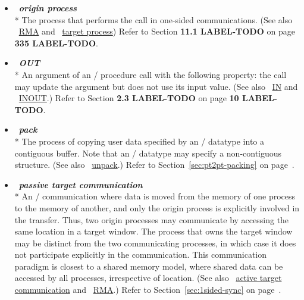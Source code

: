 \begin{itemize}
\label{glossary:origin_process}
\item  ~\hypertarget{glossary:origin_process}{\emph{\textbf{origin process}}} \\*
The process that performs the call in one-sided communications.
(See also ~\hyperlink{glossary:RMA}{RMA} and ~\hyperlink{glossary:target_process}{target process})
Refer to Section {\bf 11.1 LABEL-TODO} on page {\bf 335 LABEL-TODO}.

\label{glossary:OUT}
\item  ~\hypertarget{glossary:OUT}{\emph{\textbf{OUT}}} \\*
An argument of an \MPI/ procedure call with the following property: the call may update the argument but does not use its input value.
(See also ~\hyperlink{glossary:IN}{IN} and ~\hyperlink{glossary:INOUT}{INOUT}.)
Refer to Section {\bf 2.3 LABEL-TODO} on page {\bf 10 LABEL-TODO}.

\label{glossary:pack}
\item  ~\hypertarget{glossary:pack}{\emph{\textbf{pack}}} \\*
The process of copying user data specified by an \MPI/ datatype into a contiguous buffer.
Note that an \MPI/ datatype may specify a non-contiguous structure.
(See also ~\hyperlink{glossary:unpack}{unpack}.)
Refer to Section~\ref{sec:pt2pt-packing} on page~\pageref{sec:pt2pt-packing}.

\label{glossary:passive_target_communication}
\item  ~\hypertarget{glossary:passive_target_communication}{\emph{\textbf{passive target communication}}} \\*
An \RMA/ communication where data is moved from the memory of one
process to the memory of another, and only the origin process is
explicitly involved
in
the transfer.  Thus, two origin processes may communicate by accessing
the same location in a target window.  The process that owns the
target window may be distinct from the two communicating processes, 
in which case it does not participate explicitly in the communication.
This communication
paradigm is closest to a shared memory model, where shared data can be
accessed by all processes, irrespective 
of location. (See also ~\hyperlink{glossary:active_target_communication}{active target communication} and
~\hyperlink{glossary:RMA}{RMA}.)
Refer to Section~\ref{sec:1sided-sync} on page~\pageref{sec:1sided-sync}.


\end{itemize}
